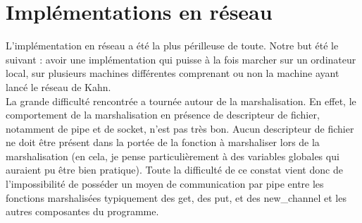 \documentclass[a4paper, 12pt, twoside]{report}
\begin{document}
\section{Implémentations en réseau}

L'implémentation en réseau a été la plus périlleuse de toute. Notre but été le suivant : avoir une implémentation qui puisse 
à la fois marcher sur un ordinateur local, sur plusieurs machines différentes comprenant ou non la machine ayant lancé le réseau 
de Kahn.\\

La grande difficulté rencontrée a tournée autour de la marshalisation. En effet, le comportement de la marshalisation en 
présence de descripteur de fichier, notamment de pipe et de socket, n'est pas très bon. Aucun descripteur de fichier ne doit 
être présent dans la portée de la fonction à marshaliser lors de la marshalisation (en cela, je pense particulièrement à des 
variables globales qui auraient pu être bien pratique). Toute la difficulté de ce constat vient donc de l'impossibilité de 
posséder un moyen de communication par pipe entre les fonctions marshalisées typiquement des get, des put, et des new\_channel 
et les autres composantes du programme.\\
\end{document}
